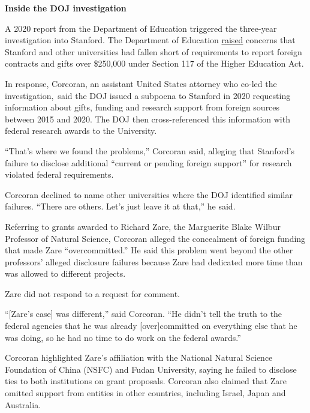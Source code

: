 \documentclass{article}%
\begin{document}
\textbf{Inside the DOJ investigation}
\par{A 2020 report from the Department of Education triggered the three-year investigation into Stanford. The Department of Education \href{https://stanforddaily.com/2020/11/24/education-department-probes-stanfords-reporting-of-chinese-financial-gifts/}{raised} concerns that Stanford and other universities had fallen short of requirements to report foreign contracts and gifts over \$250,000 under Section 117 of the Higher Education Act.}\\
\par{In response, Corcoran, an assistant United States attorney who co-led the investigation, said the DOJ issued a subpoena to Stanford in 2020 requesting information about gifts, funding and research support from foreign sources between 2015 and 2020. The DOJ then cross-referenced this information with federal research awards to the University.}\\
\par{“That’s where we found the problems,” Corcoran said, alleging that Stanford’s failure to disclose additional “current or pending foreign support” for research violated federal requirements.}\\
\par{Corcoran declined to name other universities where the DOJ identified similar failures. “There are others. Let’s just leave it at that,” he said.}\\
\par{Referring to grants awarded to Richard Zare, the Marguerite Blake Wilbur Professor of Natural Science, Corcoran alleged the concealment of foreign funding that made Zare “overcommitted.” He said this problem went beyond the other professors’ alleged disclosure failures because Zare had dedicated more time than was allowed to different projects.}\\
\par{Zare did not respond to a request for comment.}\\
\par{“[Zare’s case] was different,” said Corcoran. “He didn’t tell the truth to the federal agencies that he was already [over]committed on everything else that he was doing, so he had no time to do work on the federal awards.”}\\
\par{Corcoran highlighted Zare’s affiliation with the National Natural Science Foundation of China (NSFC) and Fudan University, saying he failed to disclose ties to both institutions on grant proposals. Corcoran also claimed that Zare omitted support from entities in other countries, including Israel, Japan and Australia.}\\
\end{document}
